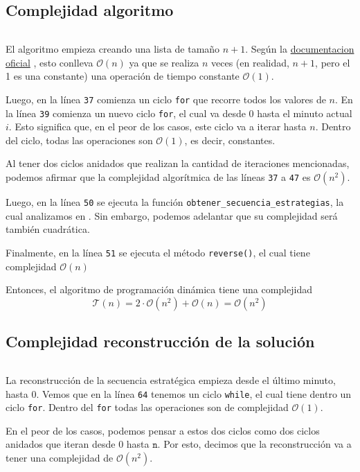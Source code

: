 \documentclass{article}
\newcommand{\docuPy}{%
  {\href{https://wiki.python.org/moin/TimeComplexity}{documentacion oficial}}
  }%
\begin{document}
\subsection{Complejidad algoritmo}
\inputminted[linenos, firstline=25, lastline=52]{python}{codigo/algoritmo.py}
El algoritmo empieza creando una lista de tamaño $n + 1$. Según la \docuPy, esto conlleva $\mathcal{O}(n)$ ya que se realiza $n$ veces (en realidad, $n + 1$, pero el 1 es una constante) una operación de tiempo constante $\mathcal{O}(1)$.

Luego, en la línea \texttt{37} comienza un ciclo \texttt{for} que recorre todos los valores de $n$. En la línea \texttt{39} comienza un nuevo ciclo \texttt{for}, el cual va desde 0 hasta el minuto actual $i$. Esto significa que, en el peor de los casos, este ciclo va a iterar hasta $n$. Dentro del ciclo, todas las operaciones son $\mathcal{O}(1)$, es decir, constantes.

Al tener dos ciclos anidados que realizan la cantidad de iteraciones mencionadas, podemos afirmar que la complejidad algorítmica de las líneas \texttt{37} a \texttt{47} es $\mathcal{O}(n^2)$.

Luego, en la línea \texttt{50} se ejecuta la función \texttt{obtener\_secuencia\_estrategias}, la cual analizamos en . Sin embargo, podemos adelantar que su complejidad será también cuadrática.

Finalmente, en la línea \texttt{51} se ejecuta el método \texttt{reverse()}, el cual tiene complejidad $\mathcal{O}(n)$

Entonces, el algoritmo de programación dinámica tiene una complejidad 
$$
\mathcal{T}(n) = 2 \cdot \mathcal{O}(n^2) + \mathcal{O}(n) = \mathcal{O}(n^2)
$$


\subsection{Complejidad reconstrucción de la solución}
\label{sec:reconstruccion}

\inputminted[linenos, firstline=54, lastline=84]{python}{codigo/algoritmo.py}
La reconstrucción de la secuencia estratégica empieza desde el último minuto, hasta 0.
Vemos que en la línea \texttt{64} tenemos un ciclo \texttt{while}, el cual tiene dentro un ciclo \texttt{for}.
Dentro del \texttt{for} todas las operaciones son de complejidad $\mathcal{O}(1)$.

En el peor de los casos, podemos pensar a estos dos ciclos como dos ciclos anidados que iteran desde 0 hasta $\texttt{n}$. Por esto, decimos que la reconstrucción va a tener una complejidad de $\mathcal{O}(n^2)$.
\end{document}
